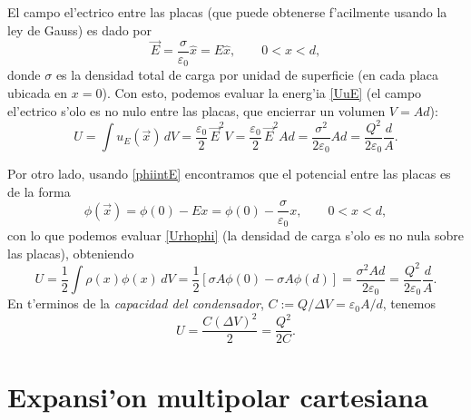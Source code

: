 El campo el'ectrico entre las placas (que puede obtenerse f'acilmente usando la ley de Gauss) es dado por
\begin{equation}
\vec{E}=\frac{\sigma}{\varepsilon_0}\hat{x}=E\hat{x}, \qquad 0<x<d,
\end{equation}
donde $\sigma$ es la densidad total de carga por unidad de superficie (en cada placa ubicada en $x=0$). Con esto, podemos evaluar la energ'ia \eqref{UuE} (el campo el'ectrico s'olo es no nulo entre las placas, que encierrar un volumen $V=Ad$):
\begin{equation} 
U=\int u_E(\vec{x})\,dV=\frac{\varepsilon_0}{2}\,
\vec{E}^2 V=\frac{\varepsilon_0}{2}\,
\vec{E}^2 Ad=\frac{\sigma^2}{2\varepsilon_0}Ad=\frac{Q^2}{2\varepsilon_0}\frac{d}{A} .
\end{equation}

Por otro lado, usando \eqref{phiintE} encontramos que el potencial entre las placas es de la forma
\begin{equation}
\phi(\vec{x})=\phi(0)-Ex=\phi(0)-\frac{\sigma}{\varepsilon_0}x, \qquad 0<x<d,
\end{equation}
con lo que podemos evaluar \eqref{Urhophi} (la densidad de carga s'olo es no nula sobre las placas), obteniendo
\begin{equation}
U=\frac{1}{2}\int\rho(x)\phi(x)\,dV=\frac{1}{2}\left[\sigma A\phi(0)-\sigma A\phi(d)\right]=\frac{\sigma^2 Ad}{2\varepsilon_0}=\frac{Q^2}{2\varepsilon_0}\frac{d}{A}.
\end{equation}
En t'erminos de la \textit{capacidad del condensador}, $C:=Q/\Delta V=\varepsilon_0 A/d$, tenemos
\begin{equation}
U=\frac{C(\Delta V)^2}{2}=\frac{Q^2}{2C}.
\end{equation}





\section{Expansi'on multipolar cartesiana}
